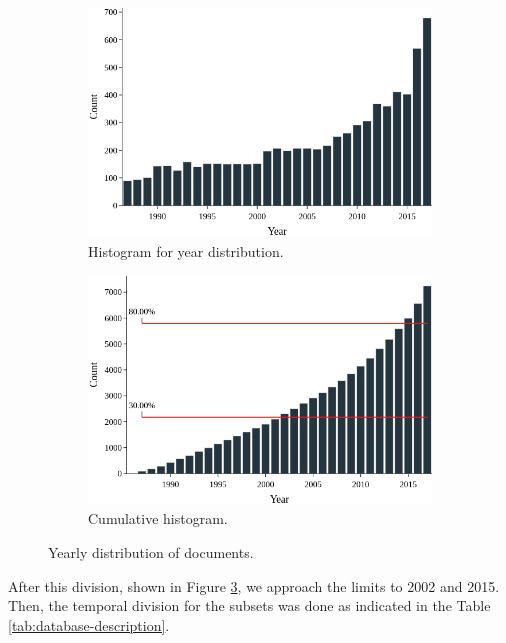 \begin{figure}[h!]
	\begin{subfigure}{0.49\textwidth}
		\includegraphics[width=\linewidth]{01.Chapters/04.Materials/yearly-histogram}
		\caption{Histogram for year distribution.} \label{fig:yearly-histogram}
	\end{subfigure}%
	\hfill
	\begin{subfigure}{0.49\textwidth}
		\includegraphics[width=\linewidth]{01.Chapters/04.Materials/yearly-cumulative}
		\caption{Cumulative histogram.} \label{fig:yearly-cumulative}
	\end{subfigure}%
	\caption{Yearly distribution of documents.}
	\label{fig:yearly-distribution}
\end{figure}

After this division, shown in Figure \ref{fig:yearly-distribution}, we approach the limits to 2002 and 2015. Then, the temporal division for the subsets was done as indicated in the Table \ref{tab:database-description}.

